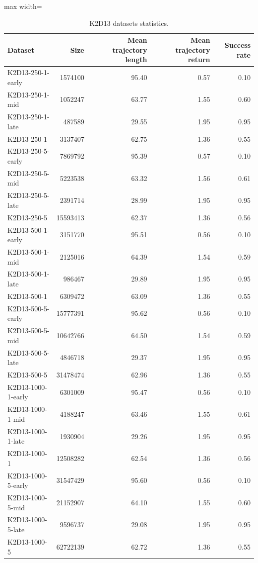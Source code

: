 \documentclass{article}
\begin{document}
\begin{table}[ht]
    \label{tab:k2d13_stats}
    \begin{center}
    \caption{K2D13 datasets statistics.}
    \begin{small}
    \begin{adjustbox}{max width=\columnwidth}
		\begin{tabular}{l|rrrr}
		\toprule
	\textbf{Dataset} & \textbf{Size} & \textbf{Mean trajectory length} & \textbf{Mean trajectory return} & \textbf{Success rate}\\
\midrule
K2D13-250-1-early & 1574100 & 95.40 & 0.57 & 0.10\\
K2D13-250-1-mid & 1052247 & 63.77 & 1.55 & 0.60\\
K2D13-250-1-late & 487589 & 29.55 & 1.95 & 0.95\\
K2D13-250-1 & 3137407 & 62.75 & 1.36 & 0.55\\
\midrule
K2D13-250-5-early & 7869792 & 95.39 & 0.57 & 0.10\\
K2D13-250-5-mid & 5223538 & 63.32 & 1.56 & 0.61\\
K2D13-250-5-late & 2391714 & 28.99 & 1.95 & 0.95\\
K2D13-250-5 & 15593413 & 62.37 & 1.36 & 0.56\\
\midrule
K2D13-500-1-early & 3151770 & 95.51 & 0.56 & 0.10\\
K2D13-500-1-mid & 2125016 & 64.39 & 1.54 & 0.59\\
K2D13-500-1-late & 986467 & 29.89 & 1.95 & 0.95\\
K2D13-500-1 & 6309472 & 63.09 & 1.36 & 0.55\\
\midrule
K2D13-500-5-early & 15777391 & 95.62 & 0.56 & 0.10\\
K2D13-500-5-mid & 10642766 & 64.50 & 1.54 & 0.59\\
K2D13-500-5-late & 4846718 & 29.37 & 1.95 & 0.95\\
K2D13-500-5 & 31478474 & 62.96 & 1.36 & 0.55\\
\midrule
K2D13-1000-1-early & 6301009 & 95.47 & 0.56 & 0.10\\
K2D13-1000-1-mid & 4188247 & 63.46 & 1.55 & 0.61\\
K2D13-1000-1-late & 1930904 & 29.26 & 1.95 & 0.95\\
K2D13-1000-1 & 12508282 & 62.54 & 1.36 & 0.56\\
\midrule
K2D13-1000-5-early & 31547429 & 95.60 & 0.56 & 0.10\\
K2D13-1000-5-mid & 21152907 & 64.10 & 1.55 & 0.60\\
K2D13-1000-5-late & 9596737 & 29.08 & 1.95 & 0.95\\
K2D13-1000-5 & 62722139 & 62.72 & 1.36 & 0.55\\
\bottomrule
\end{tabular}
        \end{adjustbox}
    \end{small}
    \end{center}
    \vskip -0.1in
\end{table}
\end{document}
